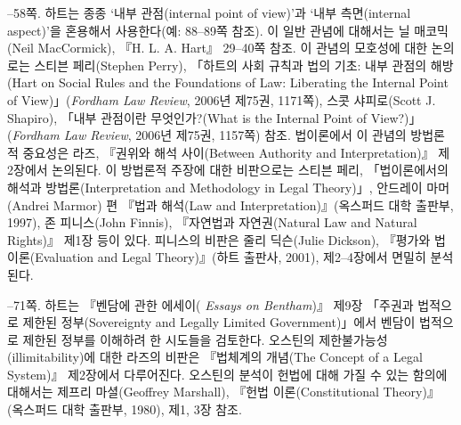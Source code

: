 {--58쪽.  하트는 종종 ‘내부
관점(internal point of view)’과 ‘내부 측면(internal aspect)’을 혼용해서
사용한다(예: 88--89쪽 참조). 이 일반 관념에 대해서는 닐 매코믹(Neil
MacCormick), 『H. L. A. Hart』 29--40쪽 참조. 이 관념의 모호성에 대한
논의로는 스티븐 페리(Stephen Perry), 「하트의 사회 규칙과 법의 기초:
내부 관점의 해방(Hart on Social Rules and the Foundations of Law:
Liberating the Internal Point of View)」(\emph{Fordham Law Review},
2006년 제75권, 1171쪽), 스콧 샤피로(Scott J. Shapiro), 「내부 관점이란
무엇인가?(What is the Internal Point of View?)」(\emph{Fordham Law
Review}, 2006년 제75권, 1157쪽) 참조. 법이론에서 이 관념의 방법론적
중요성은 라즈, 『권위와 해석 사이(Between Authority and
Interpretation)』 제2장에서 논의된다. 이 방법론적 주장에 대한 비판으로는
스티븐 페리, 「법이론에서의 해석과 방법론(Interpretation and Methodology
in Legal Theory)」, 안드레이 마머(Andrei Marmor) 편 『법과 해석(Law and
Interpretation)』(옥스퍼드 대학 출판부, 1997), 존 피니스(John Finnis),
『자연법과 자연권(Natural Law and Natural Rights)』 제1장 등이 있다.
피니스의 비판은 줄리 딕슨(Julie Dickson), 『평가와 법이론(Evaluation and
Legal Theory)』(하트 출판사, 2001), 제2--4장에서 면밀히 분석된다.

--71쪽.  하트는 『벤담에 관한
에세이( \emph{Essays on Bentham})』 제9장 「주권과 법적으로 제한된
정부(Sovereignty and Legally Limited Government)」에서 벤담이 법적으로
제한된 정부를 이해하려 한 시도들을 검토한다. 오스틴의
제한불가능성(illimitability)에 대한 라즈의 비판은 『법체계의 개념(The
Concept of a Legal System)』 제2장에서 다루어진다. 오스틴의 분석이
헌법에 대해 가질 수 있는 함의에 대해서는 제프리 마셜(Geoffrey Marshall),
『헌법 이론(Constitutional Theory)』(옥스퍼드 대학 출판부, 1980), 제1,
3장 참조.
}
